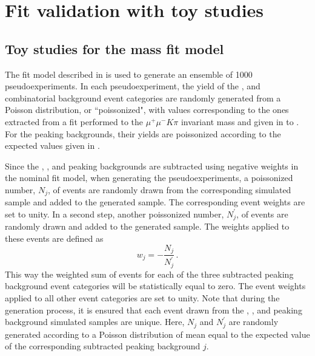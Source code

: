 \cleardoublepage
\chapter{Fit validation with toy studies}\label{app:BsJpsiKst_toys}
\section{Toy studies for the mass fit model}\label{app:BsJpsiKst_MassToysimulation}
The fit model described in  is used to generate an ensemble of 1000 pseudoexperiments. In each pseudoexperiment, the yield of the \Bs, \Bd and combinatorial background event categories are randomly generated from a Poisson distribution, or ``poissonized", with values corresponding to the ones extracted from a fit performed to the $\mu^+\mu^- K\pi$ invariant mass and given in  to . For the peaking backgrounds, their yields are poissonized according to the expected values given in .
%

Since the \BdJpsipipi, \BsJpsipipi, \BsJpsiKK and \LbJpsipK peaking backgrounds are subtracted using negative weights in the nominal fit model, when generating the pseudoexperiments, a poissonized number, $N_j$, of events are randomly drawn from the corresponding simulated sample and added to the generated sample. The corresponding event weights are set to unity. In a second step, another poissonized number, $N^{'}_j$, of events are randomly drawn and added to the generated sample. The weights applied to these events are defined as
\begin{equation}
w_j = -\frac{N_j}{N^{'}_j}\, .
\end{equation}
This way the weighted sum of events for each of the three subtracted peaking background event categories will be statistically equal to zero.
The event weights applied to all other event categories are set to unity. Note that during the generation process, it is ensured that each event drawn from the \BdJpsipipi, \BsJpsipipi, \BsJpsiKK and \LbJpsipK peaking background simulated samples are unique. Here, $N_j$ and $N^{'}_j$ are randomly generated according to a Poisson distribution of mean equal to the expected value of the corresponding subtracted peaking background $j$.
%

